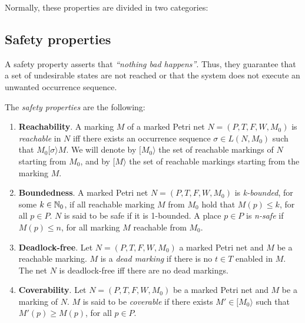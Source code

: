 \medskip
Normally, these properties are divided in two categories: %

\subsection{Safety properties}
A safety property asserts that \emph{``nothing bad happens''}.
Thus, they guarantee that a set of undesirable states are not reached or that
the system does not execute an unwanted occurrence sequence.

The \emph{safety properties} are the following:

\begin{enumerate}
\item {\bf Reachability}. A marking $M$ of a marked Petri net
$N= (P,T,F,W,M_0)$ is {\it reachable} in $N$
iff there exists an occurrence sequence $\sigma \in L(N,M_0)$
such that $M_0 [ \sigma \rangle M$. We will denote by $[M_0\rangle$ the
set of reachable markings of $N$ starting from $M_0$, and
by $[ M \rangle$ the set of reachable markings starting from the marking $M$.

\item {\bf Boundedness}. A marked Petri net $N=(P,T,F,W,M_0)$ 
is {\it k-bounded}, for some $k \in \mathbb{N}_{0}$, if all reachable marking
$M$ from $M_0$ hold that $M(p) \leq k$, for all $p \in P$. $N$ is said to be safe if
it is 1-bounded. A place $p \in P$ is
{\it n-safe} if $M(p) \leq n$, for all marking $M$ reachable from $M_0$.

\item {\bf Deadlock-free}. Let $N=(P,T,F,W,M_0)$ a marked Petri net and $M$ be a reachable marking.
$M$ is a {\it dead marking} if there is no $t \in T$ enabled in $M$. 
The net $N$ is deadlock-free iff there are no dead markings.

\item {\bf Coverability}.
Let $N=(P,T,F,W,M_0)$ be a marked Petri net and $M$ be a marking of $N$.
$M$ is said to be {\it coverable} if there exists $M' \in
[M_0 \rangle$ such that $M'(p) \geq M(p)$, for all $p \in P$.
\end{enumerate}


